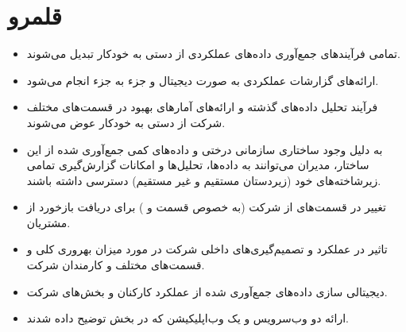 \section{قلمرو }\label{scope}
\begin{itemize}
\item 
تمامی فرآیند‌های جمع‌آوری داده‌های عملکردی از دستی به خودکار تبدیل می‌شوند.

\item 
ارائه‌های گزارشات عملکردی به صورت دیجیتال و جزء به جزء انجام می‌شود.

\item 
فرآیند تحلیل داده‌های گذشته و ارائه‌های آمار‌های بهبود در قسمت‌های مختلف شرکت از دستی به خودکار عوض می‌شوند.

\item 
به دلیل وجود ساختاری سازمانی درختی و داده‌های کمی جمع‌آوری شده از این ساختار، مدیران می‌توانند به داده‌‌ها،‌ تحلیل‌ها و امکانات گزارش‌گیری تمامی زیر‌شاخته‌های خود (زیردستان مستقیم و غیر مستقیم) دسترسی داشته باشند.

\item 
تغییر در قسمت‌های از شرکت 
(به خصوص قسمت
و 
)
برای دریافت بازخورد از مشتریان.
\item 
تاثیر در عملکرد و تصمیم‌گیری‌های داخلی شرکت در مورد میزان بهروری کلی و قسمت‌های مختلف و کارمندان شرکت.

\item 
دیجیتالی سازی داده‌های جمع‌آوری شده از عملکرد کارکنان و بخش‌های شرکت.

\item 
ارائه دو وب‌سرویس و یک وب‌اپلیکیشن که در بخش
توضیح داده شدند.
\end{itemize}
